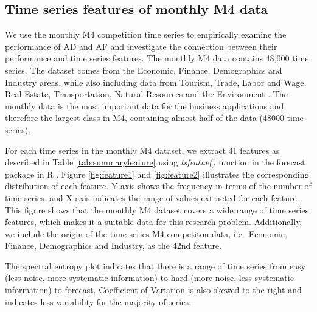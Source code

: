 \documentclass[]{elsarticle} %
\begin{document}
\hypertarget{mtsmeasure}{%
\subsection{Time series features of monthly M4 data}\label{mtsmeasure}}

We use the monthly M4 competition time series to empirically examine the
performance of AD and AF and investigate the connection between their
performance and time series features. The monthly M4 data contains
48,000 time series. The dataset comes from the Economic, Finance,
Demographics and Industry areas, while also including data from Tourism,
Trade, Labor and Wage, Real Estate, Transportation, Natural Resources
and the Environment \citep{Makridakis2018}. The monthly data is the most
important data for the business applications \citep{Spiliotis2020} and
therefore the largest class in M4, containing almost half of the data
(48000 time series).

For each time series in the monthly M4 dataset, we extract 41 features
as described in Table \ref{tab:summaryfeature} using \emph{tsfeatue()}
function in the forecast package in R \citep{hyndman2008automatic}.
Figure \ref{fig:feature1} and \ref{fig:feature2} illustrates the
corresponding distribution of each feature. Y-axis shows the frequency
in terms of the number of time series, and X-axis indicates the range of
values extracted for each feature. This figure shows that the monthly M4
dataset covers a wide range of time series features, which makes it a
suitable data for this research problem. Additionally, we include the
origin of the time series M4 competiton data, i.e.~Economic, Finance,
Demographics and Industry, as the 42nd feature.

The spectral entropy plot indicates that there is a range of time series
from easy (less noise, more systematic information) to hard (more noise,
less systematic information) to forecast. Coefficient of Variation is
also skewed to the right and indicates less variability for the majority
of series.
\end{document}
